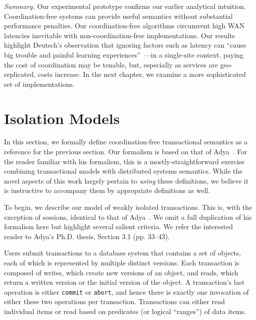 \vspace{.5em}\noindent\textit{Summary.} Our experimental prototype
confirms our earlier analytical intuition. Coordination-free systems
can provide useful semantics without substantial performance
penalties. Our coordination-free algorithms circumvent high WAN
latencies inevitable with non-coordination-free implementations. Our
results highlight Deutsch's observation that ignoring factors such as
latency can ``cause big trouble and painful learning
experiences''~\cite{fallacies-deutsch}---in a single-site context,
paying the cost of coordination may be tenable, but, especially as
services are geo-replicated, costs increase. In the next chapter, we
examine a more sophisticated set of implementations.

\FloatBarrier

\section{Isolation Models}
\label{sec:hat-definitions}

In this section, we formally define coordination-free transactional
semantics as a reference for the previous section. Our formalism is
based on that of Adya~\cite{adya}. For the reader familiar with his
formalism, this is a mostly-straightforward exercise combining
transactional models with distributed systems semantics. While the
novel aspects of this work largely pertain to \textit{using} these
definitions, we believe it is instructive to accompany them by
appropriate definitions as well.

To begin, we describe our model of weakly isolated transactions. This
is, with the exception of sessions, identical to that of
Adya~\cite{adya}. We omit a full duplication of his formalism here but
highlight several salient criteria. We refer the interested reader to
Adya's Ph.D. thesis, Section 3.1 (pp. 33--43).

Users submit transactions to a database system that contains a set of
objects, each of which is represented by multiple distinct
versions. Each transaction is composed of writes, which create new
versions of an object, and reads, which return a written version or
the initial version of the object. A transaction's last operation is
either \texttt{commit} or \texttt{abort}, and hence there is exactly one
invocation of either these two operations per
transaction. Transactions can either read individual items or read
based on predicates (or logical ``ranges'')      of data items.

